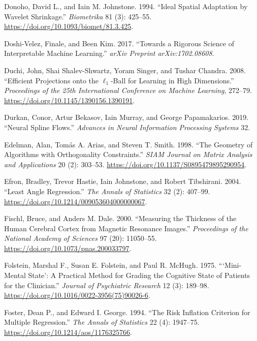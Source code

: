 \documentclass[
  10pt,
  letterpaper,
]{report}
\newlength{\cslhangindent}
\newenvironment{CSLReferences}[2] %
 {\begin{list}{}{%
  \setlength{\itemindent}{0pt}
  \setlength{\leftmargin}{0pt}
  \setlength{\parsep}{0pt}
  \ifodd #1
   \setlength{\leftmargin}{\cslhangindent}
   \setlength{\itemindent}{-1\cslhangindent}
  \fi
  \setlength{\itemsep}{#2\baselineskip}}}
 {\end{list}}
\begin{document}
\begin{CSLReferences}{1}{1}
Donoho, David L., and Iain M. Johnstone. 1994. {``Ideal Spatial
Adaptation by Wavelet Shrinkage.''} \emph{Biometrika} 81 (3): 425--55.
\url{https://doi.org/10.1093/biomet/81.3.425}.

Doshi-Velez, Finale, and Been Kim. 2017. {``Towards a Rigorous Science
of Interpretable Machine Learning.''} \emph{arXiv Preprint
arXiv:1702.08608}.

Duchi, John, Shai Shalev-Shwartz, Yoram Singer, and Tushar Chandra.
2008. {``Efficient Projections onto the \(\ell_1\)-Ball for Learning in
High Dimensions.''} \emph{Proceedings of the 25th International
Conference on Machine Learning}, 272--79.
\url{https://doi.org/10.1145/1390156.1390191}.

Durkan, Conor, Artur Bekasov, Iain Murray, and George Papamakarios.
2019. {``Neural Spline Flows.''} \emph{Advances in Neural Information
Processing Systems} 32.

Edelman, Alan, Tomás A. Arias, and Steven T. Smith. 1998. {``The
Geometry of Algorithms with Orthogonality Constraints.''} \emph{SIAM
Journal on Matrix Analysis and Applications} 20 (2): 303--53.
\url{https://doi.org/10.1137/S0895479895290954}.

Efron, Bradley, Trevor Hastie, Iain Johnstone, and Robert Tibshirani.
2004. {``Least Angle Regression.''} \emph{The Annals of Statistics} 32
(2): 407--99. \url{https://doi.org/10.1214/009053604000000067}.

Fischl, Bruce, and Anders M. Dale. 2000. {``Measuring the Thickness of
the Human Cerebral Cortex from Magnetic Resonance Images.''}
\emph{Proceedings of the National Academy of Sciences} 97 (20):
11050--55. \url{https://doi.org/10.1073/pnas.200033797}.

Folstein, Marshal F., Susan E. Folstein, and Paul R. McHugh. 1975.
{``{`Mini-Mental State'}: A Practical Method for Grading the Cognitive
State of Patients for the Clinician.''} \emph{Journal of Psychiatric
Research} 12 (3): 189--98.
\url{https://doi.org/10.1016/0022-3956(75)90026-6}.

Foster, Dean P., and Edward I. George. 1994. {``The Risk Inflation
Criterion for Multiple Regression.''} \emph{The Annals of Statistics} 22
(4): 1947--75. \url{https://doi.org/10.1214/aos/1176325766}.


\end{CSLReferences}
\end{document}
